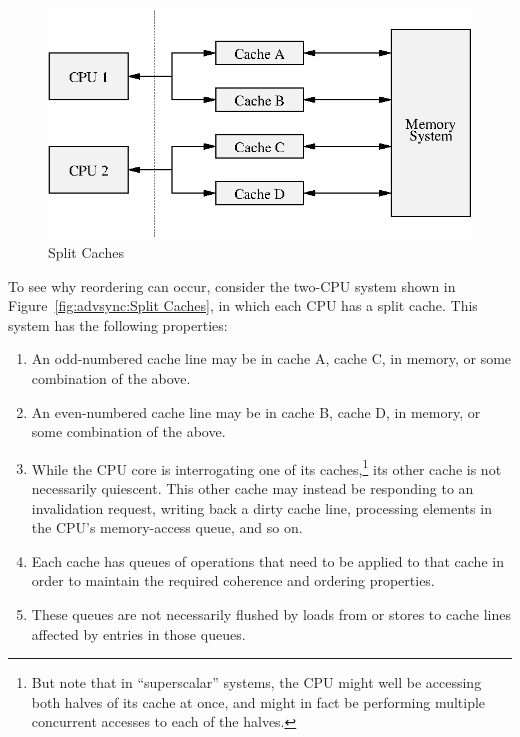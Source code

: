 \begin{figure}[htb]
\begin{center}
\includegraphics{advsync/SplitCache}
\end{center}
\caption{Split Caches}
\end{figure}

To see why reordering can occur, consider the two-CPU system shown in
Figure~\ref{fig:advsync:Split Caches}, in which each CPU has a split
cache.
This system has the following properties:
\begin{enumerate}
\item	An odd-numbered cache line may be in cache A, cache C,
	in memory, or some combination of the above.
\item	An even-numbered cache line may be in cache B, cache D,
	in memory, or some combination of the above.
\item	While the CPU core is interrogating one of its caches,\footnote{
		But note that in ``superscalar'' systems, the CPU
		might well be accessing both halves of its cache at
		once, and might in fact be performing multiple concurrent
		accesses to each of the halves.}
	its other cache is not necessarily quiescent.
	This other cache may instead be responding to an invalidation
	request, writing back a dirty cache line,
	processing elements in the CPU's memory-access queue, and
	so on.
\item	Each cache has queues of operations that need to be applied
	to that cache in order to maintain the required coherence
	and ordering properties.
\item	These queues are not necessarily flushed by loads from or
	stores to cache lines affected by entries in those queues.
\end{enumerate}

